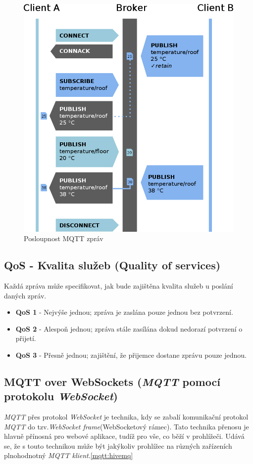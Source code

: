 \begin{figure}[ht]
  \centering
  \includegraphics[width=.7 \linewidth]{obrazky-figures/mqtt_flow.png}
  \caption{Posloupnost MQTT zpráv}
  \label{figure:mqtt_flow}
\end{figure}

\newpage
\subsection*{QoS - Kvalita služeb (Quality of services)}
Každá zpráva může specifikovat, jak bude zajištěna kvalita služeb u poslání daných zpráv.~\cite{wiki:mqtt_broker}
\begin{itemize}
  \item \textbf{QoS 1} - Nejvýše jednou; zpráva je zaslána pouze jednou bez potvrzení.
  \item \textbf{QoS 2} - Alespoň jednou; zpráva stále zasílána dokud nedorazí potvrzení o přijetí.
  \item \textbf{QoS 3} - Přesně jednou; zajištění, že přijemce dostane zprávu pouze jednou.
\end{itemize}

\subsection*{MQTT over WebSockets (\emph{MQTT} pomocí protokolu \emph{WebSocket})}
\label{mqtt:websockets}
\emph{MQTT} přes protokol \emph{WebSocket} je technika, kdy se zabalí komunikační protokol \emph{MQTT} do tzv.\emph{WebSocket frame}(WebSocketový rámec).
Tato technika přenosu je hlavně přínosná pro webové aplikace, tudíž pro vše, co běží v prohlížeči.
Udává se, že s touto technikou může být jakýkoliv prohlížec na různých zařízeních plnohodnotný \emph{MQTT klient}.\ref{mqtt:hivemq}


